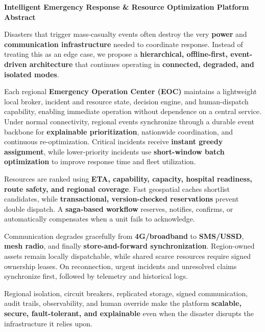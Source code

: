\documentclass[11pt,a4paper]{article}
\newcommand{\key}[1]{\textbf{\textcolor{accent}{#1}}}
\begin{document}
\begin{center}
{\Large\bfseries Intelligent Emergency Response \& Resource Optimization Platform}\\[0.6em]
{\large\bfseries Abstract}
\end{center}

Disasters that trigger mass-casualty events often destroy the very \key{power} and \key{communication infrastructure} needed to coordinate response. Instead of treating this as an edge case, we propose a \key{hierarchical, offline-first, event-driven architecture} that continues operating in \key{connected, degraded, and isolated modes}.

Each regional \key{Emergency Operation Center (EOC)} maintains a lightweight local broker, incident and resource state, decision engine, and human-dispatch capability, enabling immediate operation without dependence on a central service. Under normal connectivity, regional events synchronize through a durable event backbone for \key{explainable prioritization}, nationwide coordination, and continuous re-optimization. Critical incidents receive \key{instant greedy assignment}, while lower-priority incidents use \key{short-window batch optimization} to improve response time and fleet utilization.

Resources are ranked using \key{ETA, capability, capacity, hospital readiness, route safety, and regional coverage}. Fast geospatial caches shortlist candidates, while \key{transactional, version-checked reservations} prevent double dispatch. A \key{saga-based workflow} reserves, notifies, confirms, or automatically compensates when a unit fails to acknowledge.

Communication degrades gracefully from \key{4G/broadband} to \key{SMS/USSD}, \key{mesh radio}, and finally \key{store-and-forward synchronization}. Region-owned assets remain locally dispatchable, while shared scarce resources require signed ownership leases. On reconnection, urgent incidents and unresolved claims synchronize first, followed by telemetry and historical logs.

Regional isolation, circuit breakers, replicated storage, signed communication, audit trails, observability, and human override make the platform \key{scalable, secure, fault-tolerant, and explainable} even when the disaster disrupts the infrastructure it relies upon.
\end{document}

